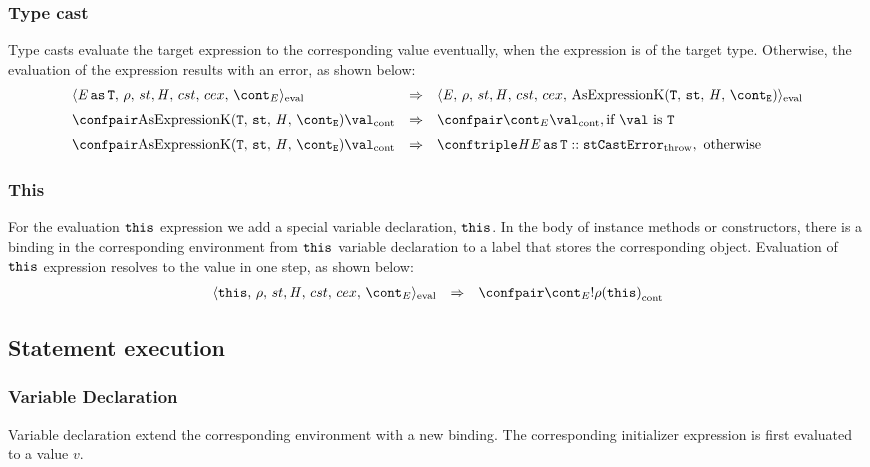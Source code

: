 \documentclass{article}
\begin{document}
\subsubsection{Type cast}
\label{subsubsec:type-cast}
\newcommand{\AsExpressionK}{\mathrm{AsExpressionK}(\tt{T},\,\strace,\,\handler,\,\econt)}
Type casts evaluate the target expression to the corresponding value eventually, when the expression is of the target type. Otherwise, the evaluation of the expression results with an error, as shown below:
\[
  \begin{array}{lcl}
	\cesktrans{
		\evalconf{\AsExpression{\expressionmeta}{\tt{T}}}{\env}{\strace}{\cstrace}{\cex}{\econt}}{
		\evalconf{\expressionmeta}{\env}{\strace}{\cstrace}{\cex}{\AsExpressionK}}
		\\[2mm]

	\cesktrans{
		\contconf{\AsExpressionK}{\val}}{
		\contconf{\econt}{\val}}, \textrm{if }\val \textrm{ is } \tt{T}\\[2mm]

	\cesktrans{
		\contconf{\AsExpressionK}{\val}}{
		\throwconf{\handler}{\AsExpression{\expressionmeta}{\tt{T}} :: \strace}{\tt{CastError}}}, \textrm{ otherwise}
    \end{array}
\]

\subsubsection{This}
For the evaluation $\tt{this}$ expression we add a special variable declaration, $\tt{this}$. In the body of instance methods or constructors, there is a binding in the corresponding environment from $\tt{this}$ variable declaration to a label that stores the corresponding object. Evaluation of $\tt{this}$ expression resolves to the value in one step, as shown below:
\[
  \begin{array}{lcl}
	\cesktrans{
		\evalconf{\ThisExpression}{\env}{\strace}{\cstrace}{\cex}{\econt}}{
		\contconf{\econt}{\deref{\env(\this)}}}
  \end{array}
\]
\subsection{Statement execution}
\label{subsec:stmt-exectution}

\subsubsection{Variable Declaration}
Variable declaration extend the corresponding environment with a new binding. The corresponding initializer expression is first evaluated to a value $v$.
\end{document}
